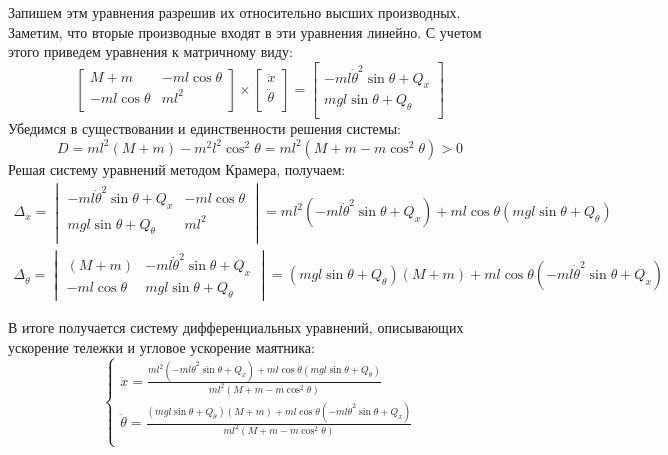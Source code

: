 Запишем этм уравнения разрешив их относительно высших производных. Заметим, что вторые производные 
входят в эти уравнения линейно. С учетом этого приведем уравнения к матричному виду: 
\begin{equation}
    \begin{bmatrix}
        M + m &  -ml\cos\theta \\
        -ml\cos\theta & ml^2 \\ 
    \end{bmatrix} \times
    \begin{bmatrix}
        \ddot{x} \\
        \ddot{\theta} \\
    \end{bmatrix} =
    \begin{bmatrix}
        -ml\dot{\theta}^2\sin\theta + Q_x \\ 
        mgl\sin\theta + Q_{\theta} \\
    \end{bmatrix}
\end{equation}
Убедимся в существовании и единственности решения системы:
\begin{equation}
    D = ml^2(M + m) - m^2l^2\cos^2\theta = ml^2(M + m - m\cos^2\theta) > 0
\end{equation}
Решая систему уравнений методом Крамера, получаем:
\begin{multline}
    \Delta_{\ddot{x}} = \begin{vmatrix}
        -ml\dot{\theta}^2\sin\theta + Q_x & -ml\cos\theta \\
        mgl\sin\theta + Q_{\theta} & ml^2 \\
    \end{vmatrix} = ml^2(-ml\dot{\theta}^2\sin\theta + Q_x) + ml\cos\theta(mgl\sin\theta + Q_{\theta}) 
\end{multline}
\begin{multline}
    \Delta_{\ddot{\theta}} = \begin{vmatrix}
        (M + m) & -ml\dot{\theta}^2\sin\theta + Q_x \\ 
        -ml\cos\theta & mgl\sin\theta + Q_{\theta} 
    \end{vmatrix} = (mgl\sin\theta + Q_{\theta})(M + m) + ml\cos\theta(-ml\dot{\theta}^2\sin\theta + Q_x) 
\end{multline}

В итоге получается систему дифференциальных уравнений, описывающих ускорение тележки и угловое ускорение маятника:
\begin{equation}
    \begin{cases}
        \ddot{x} = \frac{ml^2(-ml\dot{\theta}^2\sin\theta + Q_x) + ml\cos\theta(mgl\sin\theta + Q_{\theta}) }{ml^2(M + m - m\cos^2\theta)} \\ 
        \ddot{\theta} = \frac{(mgl\sin\theta + Q_{\theta})(M + m) + ml\cos\theta(-ml\dot{\theta}^2\sin\theta + Q_x) }{ml^2(M + m - m\cos^2\theta)} \\ 
    \end{cases}
    \label{eq:nonlinear_model}
\end{equation}

